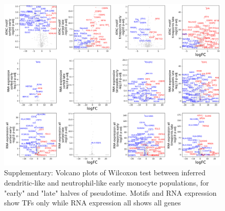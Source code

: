 \documentclass[a4paper]{article}
\begin{document}
\begin{figure}[!htb]
  \centering
  \includegraphics[width=\textwidth]{../figures/hematopoiesis/early_groups_detailed_assays.png}
  \caption{Supplementary: Volcano plots of Wilcoxon test between inferred dendritic-like and neutrophil-like early monocyte populations, for "early" and "late" halves of pseudotime. Motifs and RNA expression show TFs only while RNA expression all shows all genes}
\end{figure}
\end{document}
